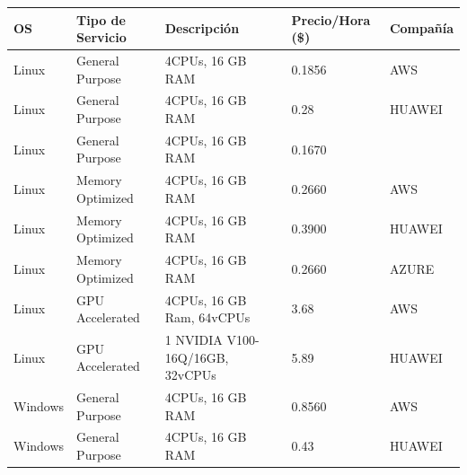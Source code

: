 \documentclass[12pt,a4paper,openright]{article}
\begin{document}
\begin{table}[ht]
\begin{adjustbox}{width=\textwidth}
\begin{tabular}{|l|l|l|l|l|}\hline
\textbf{OS} & \textbf{Tipo de Servicio} & \textbf{Descripci\'on} & \textbf{Precio/Hora (\$)}            & \textbf{Compañía} \\ \hline \hline
Linux                        & General Purpose                            & 4CPUs, 16 GB RAM                      & 0.1856                                                & AWS                                \\ \hline
Linux                        & General Purpose                            & 4CPUs, 16 GB RAM                      & 0.28                                                  & HUAWEI                             \\ \hline
Linux                        & General Purpose                            & 4CPUs, 16 GB RAM                      & 0.1670                                                &                                    \\ \hline
Linux                        & Memory Optimized                           & 4CPUs, 16 GB RAM                      &  0.2660 & AWS                                \\ \hline
Linux                        & Memory Optimized                           & 4CPUs, 16 GB RAM                      & 0.3900                                                & HUAWEI                             \\ \hline
Linux                        & Memory Optimized                           & 4CPUs, 16 GB RAM                      &  0.2660 &  AZURE      \\ \hline
Linux                        & GPU Accelerated                            & 4CPUs, 16 GB Ram, 64vCPUs             & 3.68                                                  & AWS                                \\ \hline
Linux                        & GPU Accelerated                            & 1 NVIDIA V100-16Q/16GB, 32vCPUs       & 5.89                                                  & HUAWEI                             \\ \hline
Windows                      & General Purpose                            & 4CPUs, 16 GB RAM                      & 0.8560                                                & AWS                                \\ \hline
Windows                      & General Purpose                            & 4CPUs, 16 GB RAM                      & 0.43                                                  & HUAWEI                             \\ \hline

\end{tabular}
\end{adjustbox}
\end{table}
\end{document}
